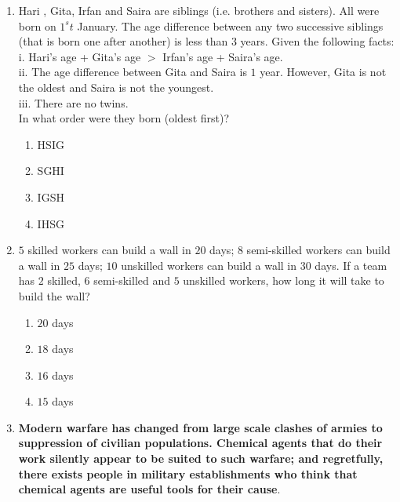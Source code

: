 \documentclass[journal]{IEEEtran}
\begin{document}
\begin{enumerate}
    \item Hari , Gita, Irfan and Saira are siblings (i.e. brothers and sisters). All were born on $1^st$ January. The age difference between any two successive siblings (that is born one after another) is less than $3$ years. Given the following facts:\\
    i. Hari's age + Gita's age $>$ Irfan's age + Saira's age.\\
    ii. The age difference between Gita and Saira is $1$ year. However, Gita is not the oldest and Saira is not the youngest.\\
    iii. There are no twins.\\
    In what order were they born (oldest first)?
    \begin{enumerate}
        \item HSIG
        \item SGHI
        \item IGSH
        \item IHSG
    \end{enumerate}
    \item $5$ skilled workers can build a wall in $20$ days; $8$ semi-skilled workers can build a wall in $25$ days; $10$ unskilled workers can build a wall in $30$ days. If a team has $2$ skilled, $6$ semi-skilled and $5$ unskilled workers, how long it will take to build the wall? 
    \begin{enumerate}
        \item $20$ days
        \item $18$ days
        \item $16$ days
        \item $15$ days
    \end{enumerate}
    \item \textbf{Modern warfare has changed from large scale clashes of armies to suppression of civilian populations. Chemical agents that do their work silently appear to be suited to such warfare; and regretfully, there exists people in military establishments who think that chemical agents are useful tools for their cause}.\\
    

\end{enumerate}
\end{document}
